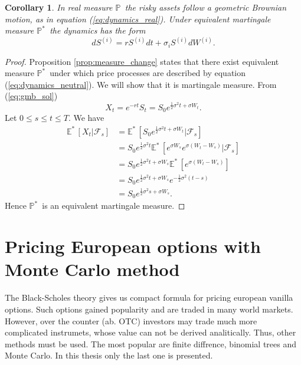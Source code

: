 \documentclass[a4paper,12pt, oneside]{book}
\newtheorem{coro}[thm]{Corollary}
\theoremstyle{definition}
\theoremstyle{remark}
\def\P{{\mathbb{P}}\,}
\def\Em{{\mathbb{E}^*}\,}
\def\Pm{{\mathbb{P}}^*\,}
\begin{document}
\begin{coro}
\label{coro:rn-dynamics}
 In real measure $\P$ the risky assets follow a geometric Brownian motion, as in equation (\ref{eq:dynamics_real}). Under equivalent martingale measure $\Pm$ the dynamics has the form
 \begin{equation}
  \label{eq:dynamics_neutral}
  dS^{(i)} = r S^{(i)} dt + \sigma_i S^{(i)} dW^{(i)}.
 \end{equation}
\end{coro}
\begin{proof}
 Proposition \ref{prop:measure_change} states that there exist equivalent measure $\Pm$ under which price processes are described by equation (\ref{eq:dynamics_neutral}). We will show that it is martingale measure.
 From (\ref{eq:gmb_sol})
 \[ X_t = e^{-rt} S_t = S_0 e^{ \frac{1}{2}\sigma^2 t + \sigma W_t }. \]
 Let $0 \leq s \leq t \leq T$. We have
 \begin{equation*}
  \begin{split}
   \Em[X_t | \mathcal{F}_s] &= \Em[ S_0 e^{ \frac{1}{2}\sigma^2 t + \sigma W_t } | \mathcal{F}_s] \\
       &= S_0 e^{\frac{1}{2}\sigma^2 t} \Em[ e^{  \sigma W_s} e^{ \sigma (W_t - W_s) } | \mathcal{F}_s] \\
       &= S_0 e^{\frac{1}{2}\sigma^2 t + \sigma W_s} \Em[ e^{ \sigma (W_t - W_s) }] \\
       &= S_0 e^{\frac{1}{2}\sigma^2 t + \sigma W_s}  e^{ -\frac{1}{2}\sigma^2(t-s) } \\
       &= S_0 e^{\frac{1}{2}\sigma^2 s + \sigma W_s}.
  \end{split}
 \end{equation*}
Hence $\Pm$ is an equivalent martingale measure.
\end{proof}


\chapter[{Pricing European options with Monte Carlo method}]{Pricing European options with \\Monte Carlo method}
The Black-Scholes theory gives us compact formula for pricing european vanilla options. Such options gained popularity and are traded in many world markets. However, over the counter (ab. OTC) investors may trade much more complicated instrumets, whose value can not be derived analitically. Thus, other methods must be used. The most popular are finite diffrence, binomial trees and Monte Carlo. In this thesis only the last one is presented.
\end{document}
